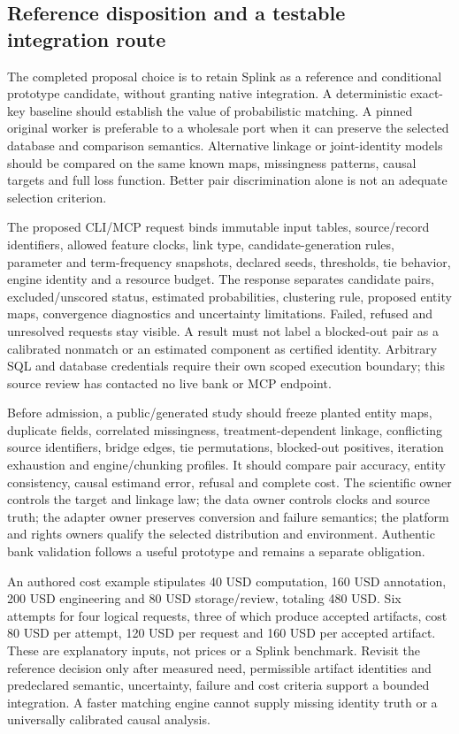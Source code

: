 \subsection{Reference disposition and a testable integration route}
The completed proposal choice is to retain Splink as a reference and conditional prototype candidate, without granting native integration. A deterministic exact-key baseline should establish the value of probabilistic matching. A pinned original worker is preferable to a wholesale port when it can preserve the selected database and comparison semantics. Alternative linkage or joint-identity models should be compared on the same known maps, missingness patterns, causal targets and full loss function. Better pair discrimination alone is not an adequate selection criterion.\citep{exec24_splink_contract}

The proposed CLI/MCP request binds immutable input tables, source/record identifiers, allowed feature clocks, link type, candidate-generation rules, parameter and term-frequency snapshots, declared seeds, thresholds, tie behavior, engine identity and a resource budget. The response separates candidate pairs, excluded/unscored status, estimated probabilities, clustering rule, proposed entity maps, convergence diagnostics and uncertainty limitations. Failed, refused and unresolved requests stay visible. A result must not label a blocked-out pair as a calibrated nonmatch or an estimated component as certified identity. Arbitrary SQL and database credentials require their own scoped execution boundary; this source review has contacted no live bank or MCP endpoint.\citep{exec24_splink_contract}

Before admission, a public/generated study should freeze planted entity maps, duplicate fields, correlated missingness, treatment-dependent linkage, conflicting source identifiers, bridge edges, tie permutations, blocked-out positives, iteration exhaustion and engine/chunking profiles. It should compare pair accuracy, entity consistency, causal estimand error, refusal and complete cost. The scientific owner controls the target and linkage law; the data owner controls clocks and source truth; the adapter owner preserves conversion and failure semantics; the platform and rights owners qualify the selected distribution and environment. Authentic bank validation follows a useful prototype and remains a separate obligation.\citep{exec24_splink_contract}

An authored cost example stipulates 40 USD computation, 160 USD annotation, 200 USD engineering and 80 USD storage/review, totaling 480 USD. Six attempts for four logical requests, three of which produce accepted artifacts, cost 80 USD per attempt, 120 USD per request and 160 USD per accepted artifact. These are explanatory inputs, not prices or a Splink benchmark. Revisit the reference decision only after measured need, permissible artifact identities and predeclared semantic, uncertainty, failure and cost criteria support a bounded integration. A faster matching engine cannot supply missing identity truth or a universally calibrated causal analysis.\citep{exec24_splink_contract}
